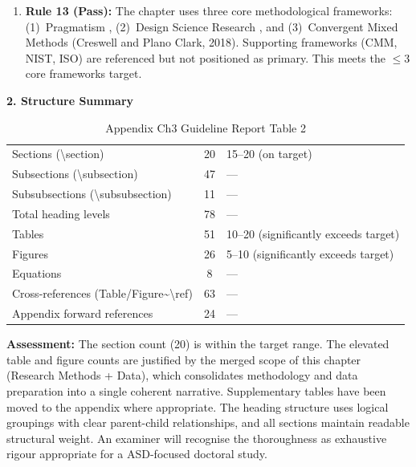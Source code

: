 \begin{enumerate}[nosep, leftmargin=*]
\item \textbf{Rule 13 (Pass):} The chapter uses three core methodological frameworks: (1)~Pragmatism \citep{creswell2018research}, (2)~Design Science Research \citep{hevner2004design}, and (3)~Convergent Mixed Methods (Creswell and Plano Clark, 2018). Supporting frameworks (CMM, NIST, ISO) are referenced but not positioned as primary. This meets the $\leq$3 core frameworks target.
\end{enumerate}

\noindent\textbf{\color{ggunavy}2. Structure Summary}

\begin{table}[H]
\tablefontsize
\caption{Appendix Ch3 Guideline Report Table 2}
\tablestripes
\begin{tabularx}{\textwidth}{@{} l c L @{}}
\toprule
{} &  &  \\
\midrule
Sections (\textbackslash section) & 20 & 15--20 (on target) \\
Subsections (\textbackslash subsection) & 47 & --- \\
Subsubsections (\textbackslash subsubsection) & 11 & --- \\
Total heading levels & 78 & --- \\
Tables & 51 & 10--20 (significantly exceeds target) \\
Figures & 26 & 5--10 (significantly exceeds target) \\
Equations & 8 & --- \\
Cross-references (Table/Figure\textasciitilde\textbackslash ref) & 63 & --- \\
Appendix forward references & 24 & --- \\
\bottomrule
\end{tabularx}
\end{table}

\noindent\textbf{Assessment:} The section count (20) is within the target range. The elevated table and figure counts are justified by the merged scope of this chapter (Research Methods + Data), which consolidates methodology and data preparation into a single coherent narrative. Supplementary tables have been moved to the appendix where appropriate. The heading structure uses logical groupings with clear parent-child relationships, and all sections maintain readable structural weight. An examiner will recognise the thoroughness as exhaustive rigour appropriate for a ASD-focused doctoral study.

